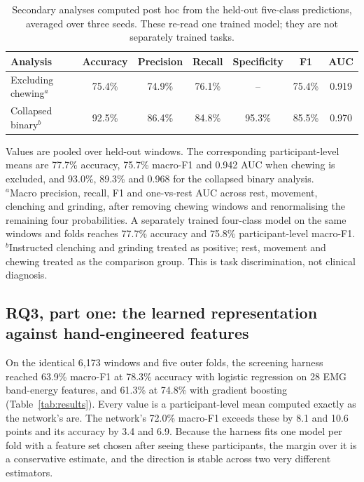 \documentclass[pdflatex,sn-nature,iicol]{sn-jnl}
\begin{document}
\begin{table}[t]
  \caption{Secondary analyses computed post hoc from the held-out five-class predictions, averaged over three seeds. These re-read one trained model; they are not separately trained tasks.}
  \label{tab:sensitivity}
  \centering
  \small
  \begin{tabular*}{\textwidth}{@{\extracolsep{\fill}}lcccccc@{}}
    \toprule
    Analysis & Accuracy & Precision & Recall & Specificity & F1 & AUC \\
    \midrule
    Excluding chewing$^{a}$ & 75.4\% & 74.9\% & 76.1\% & -- & 75.4\% & 0.919 \\
    Collapsed binary$^{b}$ & 92.5\% & 86.4\% & 84.8\% & 95.3\% & 85.5\% & 0.970 \\
    \bottomrule
  \end{tabular*}
  \begin{flushleft}\footnotesize
  Values are pooled over held-out windows. The corresponding participant-level means are 77.7\% accuracy, 75.7\% macro-F1 and 0.942 AUC when chewing is excluded, and 93.0\%, 89.3\% and 0.968 for the collapsed binary analysis.\\
  $^{a}$Macro precision, recall, F1 and one-vs-rest AUC across rest, movement, clenching and grinding, after removing chewing windows and renormalising the remaining four probabilities. A separately trained four-class model on the same windows and folds reaches 77.7\% accuracy and 75.8\% participant-level macro-F1.\\
  $^{b}$Instructed clenching and grinding treated as positive; rest, movement and chewing treated as the comparison group. This is task discrimination, not clinical diagnosis.
  \end{flushleft}
\end{table}

\subsection{RQ3, part one: the learned representation against hand-engineered features}
\label{sec:rq3}

On the identical 6,173 windows and five outer folds, the screening harness reached 63.9\% macro-F1 at 78.3\% accuracy with logistic regression on 28 EMG band-energy features, and 61.3\% at 74.8\% with gradient boosting (Table~\ref{tab:results}). Every value is a participant-level mean computed exactly as the network's are. The network's 72.0\% macro-F1 exceeds these by 8.1 and 10.6 points and its accuracy by 3.4 and 6.9. Because the harness fits one model per fold with a feature set chosen after seeing these participants, the margin over it is a conservative estimate, and the direction is stable across two very different estimators.
\end{document}
